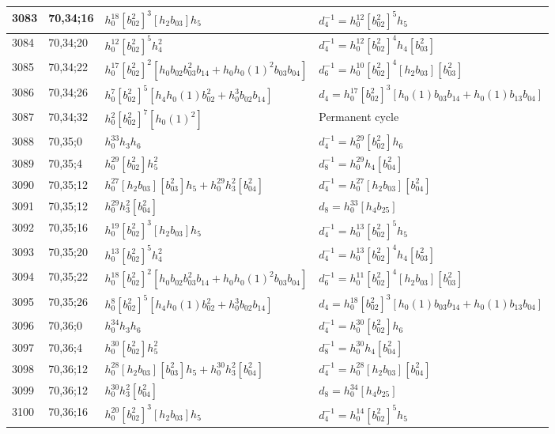 \documentclass{article}
\begin{document}
\begin{longtable}{|l|l|>{\raggedright\arraybackslash}p{6cm}|>{\raggedright\arraybackslash}p{6cm}|}
\hline
3083 & 70,34;16 & $h_0^{18}[b_{02}^2]^3[h_2b_{03}]h_5$ & $d_{4}^{-1}=h_0^{12}[b_{02}^2]^5h_5$\\
\hline
3084 & 70,34;20 & $h_0^{12}[b_{02}^2]^5h_4^2$ & $d_{4}^{-1}=h_0^{12}[b_{02}^2]^4h_4[b_{03}^2]$\\
\hline
3085 & 70,34;22 & $h_0^{17}[b_{02}^2]^2[h_0b_{02}b_{03}^2b_{14} + h_0h_0(1)^2b_{03}b_{04}]$ & $d_{6}^{-1}=h_0^{10}[b_{02}^2]^4[h_2b_{03}][b_{03}^2]$\\
\hline
3086 & 70,34;26 & $h_0^7[b_{02}^2]^5[h_4h_0(1)b_{02}^2 + h_0^3b_{02}b_{14}]$ &$d_{4}=h_0^{17}[b_{02}^2]^3[h_0(1)b_{03}b_{14} + h_0(1)b_{13}b_{04}]$\\
\hline
3087 & 70,34;32 & $h_0^2[b_{02}^2]^7[h_0(1)^2]$ & Permanent cycle\\
\hline
3088 & 70,35;0 & $h_0^{33}h_3h_6$ & $d_{4}^{-1}=h_0^{29}[b_{02}^2]h_6$\\
\hline
3089 & 70,35;4 & $h_0^{29}[b_{02}^2]h_5^2$ & $d_{8}^{-1}=h_0^{29}h_4[b_{04}^2]$\\
\hline
3090 & 70,35;12 & $h_0^{27}[h_2b_{03}][b_{03}^2]h_5 + h_0^{29}h_3^2[b_{04}^2]$ & $d_{4}^{-1}=h_0^{27}[h_2b_{03}][b_{04}^2]$\\
3091 & 70,35;12 & $h_0^{29}h_3^2[b_{04}^2]$ &$d_{8}=h_0^{33}[h_4b_{25}]$\\
\hline
3092 & 70,35;16 & $h_0^{19}[b_{02}^2]^3[h_2b_{03}]h_5$ & $d_{4}^{-1}=h_0^{13}[b_{02}^2]^5h_5$\\
\hline
3093 & 70,35;20 & $h_0^{13}[b_{02}^2]^5h_4^2$ & $d_{4}^{-1}=h_0^{13}[b_{02}^2]^4h_4[b_{03}^2]$\\
\hline
3094 & 70,35;22 & $h_0^{18}[b_{02}^2]^2[h_0b_{02}b_{03}^2b_{14} + h_0h_0(1)^2b_{03}b_{04}]$ & $d_{6}^{-1}=h_0^{11}[b_{02}^2]^4[h_2b_{03}][b_{03}^2]$\\
\hline
3095 & 70,35;26 & $h_0^8[b_{02}^2]^5[h_4h_0(1)b_{02}^2 + h_0^3b_{02}b_{14}]$ &$d_{4}=h_0^{18}[b_{02}^2]^3[h_0(1)b_{03}b_{14} + h_0(1)b_{13}b_{04}]$\\
\hline
3096 & 70,36;0 & $h_0^{34}h_3h_6$ & $d_{4}^{-1}=h_0^{30}[b_{02}^2]h_6$\\
\hline
3097 & 70,36;4 & $h_0^{30}[b_{02}^2]h_5^2$ & $d_{8}^{-1}=h_0^{30}h_4[b_{04}^2]$\\
\hline
3098 & 70,36;12 & $h_0^{28}[h_2b_{03}][b_{03}^2]h_5 + h_0^{30}h_3^2[b_{04}^2]$ & $d_{4}^{-1}=h_0^{28}[h_2b_{03}][b_{04}^2]$\\
3099 & 70,36;12 & $h_0^{30}h_3^2[b_{04}^2]$ &$d_{8}=h_0^{34}[h_4b_{25}]$\\
\hline
3100 & 70,36;16 & $h_0^{20}[b_{02}^2]^3[h_2b_{03}]h_5$ & $d_{4}^{-1}=h_0^{14}[b_{02}^2]^5h_5$\\

\end{longtable}
\end{document}
